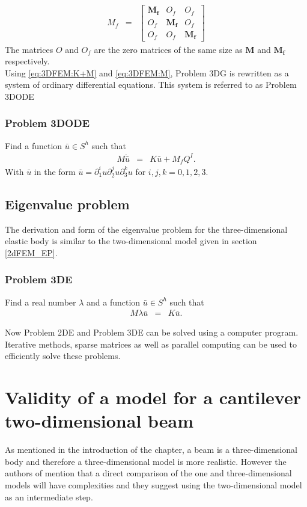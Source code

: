 \begin{eqnarray}
	M_f & = &
	\begin{bmatrix}
		\mathbf{M_f} & {O_f} & {O_f}\\
		{O_f} & \mathbf{M_f} & {O_f}\\
		{O_f} & {O_f} & \mathbf{M_f}
	\end{bmatrix}\label{eq:3DFEM:M}
\end{eqnarray}
The matrices ${O}$ and ${O_f}$ are the zero matrices of the same size as $\mathbf{M}$ and $\mathbf{M_f}$ respectively.\\

Using \eqref{eq:3DFEM:K+M} and \eqref{eq:3DFEM:M}, Problem 3DG is rewritten as a system of ordinary differential equations. This system is referred to as Problem 3DODE

\subsubsection{Problem 3DODE}
Find a function $\bar{u} \in S^h$ such that
\begin{eqnarray}
	M\ddot{\bar{u}} & = & K\bar{u} + M_{f}Q^I. \label{3D_M}
\end{eqnarray} With $\bar{u}$ in the form $\bar{u} = \partial^i_1u \partial^j_2u \partial^k_3u$ for $i,j,k = 0,1,2,3$.

\subsection{Eigenvalue problem}
The derivation and form of the eigenvalue problem for the three-dimensional elastic body is similar to the two-dimensional model given in section \ref{2dFEM_EP}.

\subsubsection{Problem 3DE}\label{3dFEM_EP}
Find a real number $\lambda$ and a function $\bar{u} \in S^h$ such that
\begin{eqnarray}
	M\lambda{\bar{u}} & = & K\bar{u}.
\end{eqnarray}

Now Problem 2DE and Problem 3DE can be solved using a computer program. Iterative methods, sparse matrices as well as parallel computing can be used to efficiently solve these problems.

\section{Validity of a model for a cantilever two-dimensional beam} \label{sec:validity-of-a-2d-beam}
As mentioned in the introduction of the chapter, a beam is a three-dimensional body and therefore a three-dimensional model is more realistic. However the authors of \cite{LVV09} mention that a direct comparison of the one and three-dimensional models will have complexities and they suggest using the two-dimensional model as an intermediate step.

